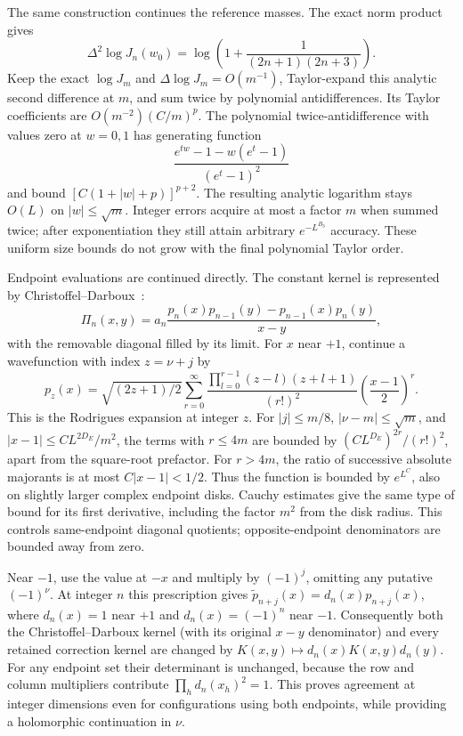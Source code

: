 The same construction continues the reference masses. The exact norm
product gives
\[
 \Delta^2\log J_n(w_0)
   =\log\!\left(1+\frac1{(2n+1)(2n+3)}\right).
\]
Keep the exact \(\log J_m\) and \(\Delta\log J_m=O(m^{-1})\),
Taylor-expand this analytic second difference at \(m\), and sum
twice by polynomial antidifferences. Its Taylor coefficients are
\(O(m^{-2})(C/m)^p\). The polynomial twice-antidifference with
values zero at \(w=0,1\) has generating function
\[
 \frac{e^{tw}-1-w(e^t-1)}{(e^t-1)^2}
\]
and bound \([C(1+|w|+p)]^{p+2}\). The resulting analytic logarithm
stays \(O(L)\) on \(|w|\le\sqrt m\). Integer errors acquire at
most a factor \(m\) when summed twice; after exponentiation they
still attain arbitrary \(e^{-L^{B_3}}\) accuracy. These uniform
size bounds do not grow with the final polynomial Taylor order.

Endpoint evaluations are continued directly. The constant kernel is
represented by Christoffel--Darboux~\cite[equation~18.2.12]{DLMF18}:
\[
 \Pi_n(x,y)=a_n
   \frac{p_n(x)p_{n-1}(y)-p_{n-1}(x)p_n(y)}{x-y},
\]
with the removable diagonal filled by its limit. For \(x\) near
\(+1\), continue a wavefunction with index \(z=\nu+j\) by
\[
 p_z(x)=\sqrt{(2z+1)/2}
 \sum_{r=0}^{\infty}
 \frac{\prod_{l=0}^{r-1}(z-l)(z+l+1)}{(r!)^2}
                  \left(\frac{x-1}{2}\right)^r.
\]
This is the Rodrigues expansion at integer \(z\). For
\(|j|\le m/8\), \(|\nu-m|\le\sqrt m\), and
\(|x-1|\le C L^{2D_E}/m^2\), the terms with \(r\le4m\) are
bounded by \((C L^{D_E})^{2r}/(r!)^2\), apart from the square-root
prefactor. For \(r>4m\), the ratio of successive absolute
majorants is at most \(C|x-1|<1/2\). Thus the function is bounded
by \(e^{L^C}\), also on slightly larger complex endpoint disks.
Cauchy estimates give the same type of bound for its first derivative,
including the factor \(m^2\) from the disk radius. This controls
same-endpoint diagonal quotients; opposite-endpoint denominators
are bounded away from zero.

Near \(-1\), use the value at \(-x\) and multiply by
\((-1)^j\), omitting any putative \((-1)^\nu\). At integer \(n\)
this prescription gives
\(\widetilde p_{n+j}(x)=d_n(x)p_{n+j}(x)\), where
\(d_n(x)=1\) near \(+1\) and \(d_n(x)=(-1)^n\) near \(-1\).
Consequently both the Christoffel--Darboux kernel (with its original
\(x-y\) denominator) and every retained correction kernel are
changed by \(K(x,y)\mapsto d_n(x)K(x,y)d_n(y)\). For any endpoint
set their determinant is unchanged, because the row and column
multipliers contribute \(\prod_h d_n(x_h)^2=1\). This proves
agreement at integer dimensions even for configurations using both
endpoints, while providing a holomorphic continuation in \(\nu\).


